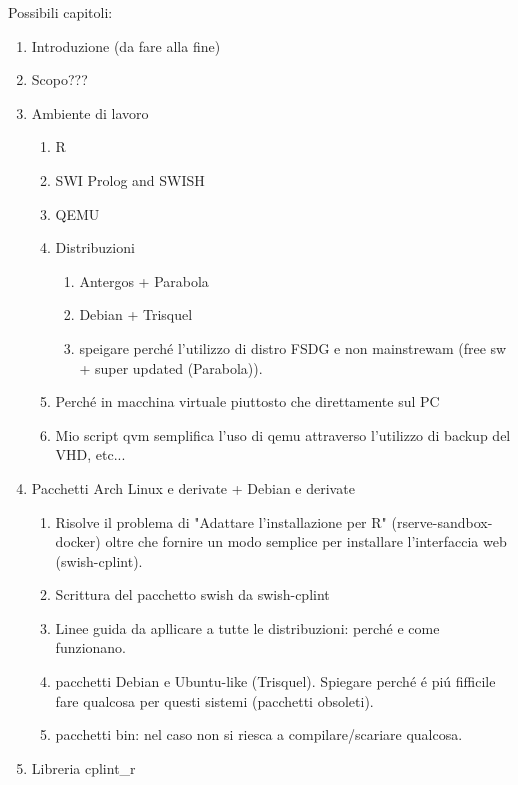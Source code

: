 \documentclass[10pt,titlepage,twoside,a4paper]{report}
\begin{document}
Possibili capitoli:
\begin{enumerate}
    \item Introduzione (da fare alla fine)
    \item Scopo???
    \item Ambiente di lavoro
    \begin{enumerate}
        \item R
        \item SWI Prolog and SWISH
        \item QEMU
        \item Distribuzioni
            \begin{enumerate}
                \item Antergos + Parabola
                \item Debian + Trisquel
                \item speigare perch\'e 
                      l'utilizzo di distro FSDG e non mainstrewam (free sw + 
                      super updated (Parabola)).
            \end{enumerate}
        \item Perch\'e in macchina virtuale piuttosto che direttamente sul PC
        \item Mio script qvm semplifica l'uso di qemu attraverso l'utilizzo di 
              backup del VHD, etc...
    \end{enumerate}
    \item Pacchetti Arch Linux e derivate + Debian e derivate
    \begin{enumerate}
        \item Risolve il problema di "Adattare l'installazione per R" 
              (rserve-sandbox-docker) oltre che fornire un modo semplice per 
              installare l'interfaccia web (swish-cplint).
        \item Scrittura del pacchetto swish da swish-cplint
        \item Linee guida da apllicare a tutte le distribuzioni: perch\'e e 
              come funzionano.
        \item pacchetti Debian e Ubuntu-like (Trisquel). Spiegare perch\'e \'e 
              pi\'u fifficile fare qualcosa per questi sistemi (pacchetti 
              obsoleti).
        \item pacchetti bin: nel caso non si riesca a compilare/scariare 
              qualcosa.
    \end{enumerate}
    \item Libreria cplint\_r
    \begin{enumerate}

\end{enumerate}
\end{enumerate}
\end{document}
